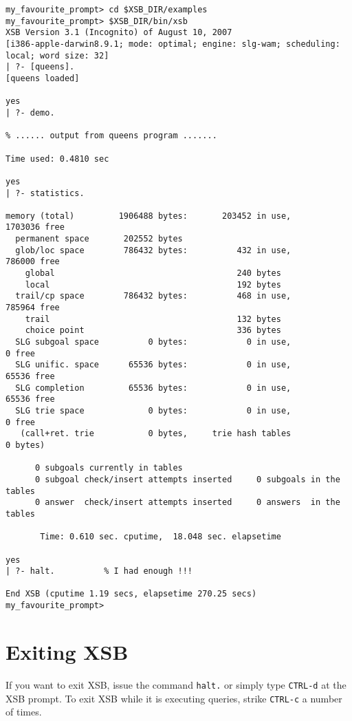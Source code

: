 {\footnotesize
 \begin{verbatim}
my_favourite_prompt> cd $XSB_DIR/examples
my_favourite_prompt> $XSB_DIR/bin/xsb
XSB Version 3.1 (Incognito) of August 10, 2007
[i386-apple-darwin8.9.1; mode: optimal; engine: slg-wam; scheduling: local; word size: 32]
| ?- [queens].
[queens loaded]

yes
| ?- demo.

% ...... output from queens program .......

Time used: 0.4810 sec

yes
| ?- statistics.

memory (total)         1906488 bytes:       203452 in use,      1703036 free
  permanent space       202552 bytes
  glob/loc space        786432 bytes:          432 in use,       786000 free
    global                                     240 bytes
    local                                      192 bytes
  trail/cp space        786432 bytes:          468 in use,       785964 free
    trail                                      132 bytes
    choice point                               336 bytes
  SLG subgoal space          0 bytes:            0 in use,            0 free
  SLG unific. space      65536 bytes:            0 in use,        65536 free
  SLG completion         65536 bytes:            0 in use,        65536 free
  SLG trie space             0 bytes:            0 in use,            0 free
   (call+ret. trie           0 bytes,     trie hash tables            0 bytes)

      0 subgoals currently in tables
      0 subgoal check/insert attempts inserted     0 subgoals in the tables
      0 answer  check/insert attempts inserted     0 answers  in the tables

       Time: 0.610 sec. cputime,  18.048 sec. elapsetime

yes
| ?- halt.          % I had enough !!!

End XSB (cputime 1.19 secs, elapsetime 270.25 secs)
my_favourite_prompt>
 \end{verbatim}
}


\section{Exiting XSB}

If you want to exit XSB, issue the command \verb'halt.' or
simply type \verb'CTRL-d' at the XSB prompt. To exit XSB while it is
executing queries, strike \verb'CTRL-c' a number of times.


